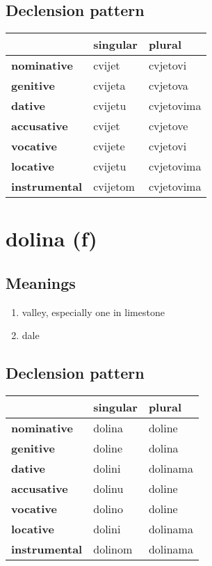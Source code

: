 \subsection*{Declension pattern}
\begin{tabularx}{\linewidth}{Xll}
\toprule
{} &  singular &      plural \\
\midrule
\textbf{nominative  } &    cvijet &    cvjetovi \\
\textbf{genitive    } &   cvijeta &    cvjetova \\
\textbf{dative      } &   cvijetu &  cvjetovima \\
\textbf{accusative  } &    cvijet &    cvjetove \\
\textbf{vocative    } &   cvijete &    cvjetovi \\
\textbf{locative    } &   cvijetu &  cvjetovima \\
\textbf{instrumental} &  cvijetom &  cvjetovima \\
\bottomrule
\end{tabularx}

\filbreak
\section{dolina (f)}
\subsection*{Meanings}
\begin{enumerate}
\item valley, especially one in limestone
\item dale
\end{enumerate}
\subsection*{Declension pattern}
\begin{tabularx}{\linewidth}{Xll}
\toprule
{} & singular &    plural \\
\midrule
\textbf{nominative  } &   dolina &    doline \\
\textbf{genitive    } &   doline &    dolina \\
\textbf{dative      } &   dolini &  dolinama \\
\textbf{accusative  } &   dolinu &    doline \\
\textbf{vocative    } &   dolino &    doline \\
\textbf{locative    } &   dolini &  dolinama \\
\textbf{instrumental} &  dolinom &  dolinama \\
\bottomrule
\end{tabularx}

